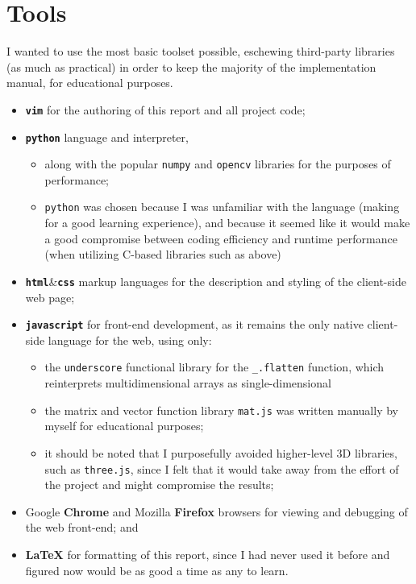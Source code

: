 \section{Tools}
I wanted to use the most basic toolset possible, eschewing third-party libraries (as much as practical) in order to keep the majority of the implementation manual, for educational purposes.
\begin{itemize}
\item \textbf{\texttt{vim}} for the authoring of this report and all project code;
\item \textbf{\texttt{python}} language and interpreter,
    \begin{itemize}
    \item along with the popular \verb!numpy! and \verb!opencv! libraries for the purposes of performance;
    \item \verb!python! was chosen because I was unfamiliar with the language (making for a good learning experience), and because it seemed like it would make a good compromise between coding efficiency and runtime performance (when utilizing C-based libraries such as above)
    \end{itemize}
\item \textbf{\texttt{html}}\&\textbf{\texttt{css}} markup languages for the description and styling of the client-side web page;
\item \textbf{\texttt{javascript}} for front-end development, as it remains the only native client-side language for the web, using only:
    \begin{itemize}
    \item the \verb!underscore! functional library for the \verb!_.flatten! function, which reinterprets multidimensional arrays as single-dimensional
    \item the matrix and vector function library \verb!mat.js! was written manually by myself for educational purposes;
    \item it should be noted that I purposefully avoided higher-level 3D libraries, such as \verb!three.js!, since I felt that it would take away from the effort of the project and might compromise the results;
    \end{itemize}
\item Google \textbf{Chrome} and Mozilla \textbf {Firefox} browsers for viewing and debugging of the web front-end; and
\item \textbf{\LaTeX} for formatting of this report, since I had never used it before and figured now would be as good a time as any to learn.
\end{itemize}


